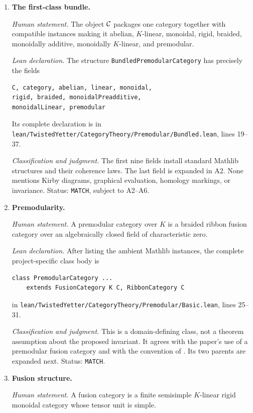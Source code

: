 \begin{enumerate}[label=\textbf{A\arabic*.},leftmargin=*]

\item \textbf{The first-class bundle.}

\emph{Human statement.}
The object $\mathcal{C}$ packages one category together with compatible instances
making it abelian, $K$-linear, monoidal, rigid, braided, monoidally additive,
monoidally $K$-linear, and premodular.

\emph{Lean declaration.}
The structure \texttt{BundledPremodularCategory} has precisely the fields
\begin{verbatim}
C, category, abelian, linear, monoidal,
rigid, braided, monoidalPreadditive,
monoidalLinear, premodular
\end{verbatim}
Its complete declaration is in
\nolinkurl{lean/TwistedYetter/CategoryTheory/Premodular/Bundled.lean}, lines
19--37.

\emph{Classification and judgment.}
The first nine fields install standard Mathlib structures and their coherence
laws.  The last field is expanded in A2.  None mentions Kirby diagrams,
graphical evaluation, homology markings, or invariance.  Status:
\texttt{MATCH}, subject to A2--A6.

\item \textbf{Premodularity.}

\emph{Human statement.}
A premodular category over $K$ is a braided ribbon fusion category over an
algebraically closed field of characteristic zero.

\emph{Lean declaration.}
After listing the ambient Mathlib instances, the complete project-specific
class body is
\begin{verbatim}
class PremodularCategory ...
    extends FusionCategory K C, RibbonCategory C
\end{verbatim}
in \nolinkurl{lean/TwistedYetter/CategoryTheory/Premodular/Basic.lean}, lines
25--31.

\emph{Classification and judgment.}
This is a domain-defining class, not a theorem assumption about the proposed
invariant.  It agrees with the paper's use of a premodular fusion category and
with the convention of \cite[Definition~8.13.1]{EGNO2015}.  Its two parents are
expanded next.  Status: \texttt{MATCH}.

\item \textbf{Fusion structure.}

\emph{Human statement.}
A fusion category is a finite semisimple $K$-linear rigid monoidal category
whose tensor unit is simple.


\end{enumerate}
